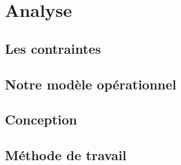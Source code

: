\part{Analyse}

\clearemptydoublepage
\chapter{Les contraintes}
\minitoc



\clearemptydoublepage
\chapter{Notre modèle opérationnel}
\minitoc



\clearemptydoublepage
\chapter{Conception}
\minitoc



\clearemptydoublepage
\chapter{Méthode de travail}
\minitoc

